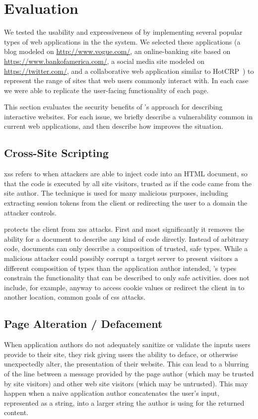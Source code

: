 \section{Evaluation}
\label{future-web:evaluation}

We tested the usability and expressiveness of \CDF by implementing several
popular types of web applications in the the system.  We selected
these applications (a blog modeled on \url{http://www.vogue.com/},
an online-banking site based on \url{https://www.bankofamerica.com/}, a social
media site modeled on \url{https://twitter.com/}, and a collaborative web application similar to
HotCRP~\cite{hotCRPhomepage}) to represent the range of sites that web users
commonly interact with.  In each case we were able to replicate the
user-facing functionality of each page.

This section evaluates the security benefits of \CDF's approach for describing
interactive websites.  For each issue, we briefly
describe a vulnerability common in current web applications, and then
describe how \CDF improves the situation.


\subsection{Cross-Site Scripting}
\gls{xss} refers to when attackers are able to inject \JS code
into an HTML document, so that the code is executed by all site visitors, trusted
as if the code came from the site author.  The technique is used for many
malicious purposes, including extracting session tokens from the client or
redirecting the user to a domain the attacker controls.

\CDF protects the client from \gls{xss} attacks.  First and most
significantly it removes the ability for a document to describe any kind of
\JS code directly.  Instead of arbitrary code, \CDF documents can only describe
a composition of trusted, safe types.  While a malicious attacker could
possibly corrupt a target server to present visitors a different
composition of types than the application author intended, \CDF's types
constrain the functionality that can be described to only safe activities.  \CDF
does not include, for example, anyway to access cookie values or
redirect the client in \JS to another location, common goals of \gls{css} attacks.


\subsection{Page Alteration / Defacement}
When application authors do not adequately sanitize or validate the inputs
users provide to their site, they risk giving users the ability to deface, or
otherwise unexpectedly alter, the presentation of their website.  This
can lead to a blurring of the line between a message provided by the page
author (which may be trusted by site visitors) and other web site visitors
(which may be untrusted).  This may happen when a naive application
author concatenates the user's input, represented
as a string, into a larger string the author is using for the returned
content.

